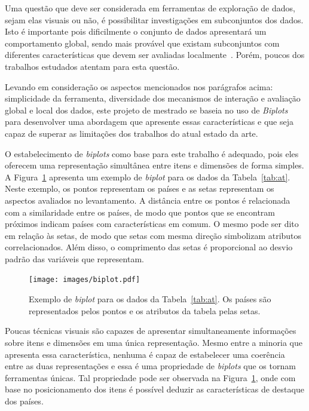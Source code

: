 Uma questão que deve ser considerada em ferramentas de
exploração de dados, sejam elas visuais ou não, é
possibilitar investigações em subconjuntos dos dados. Isto é
importante pois dificilmente o conjunto de dados apresentará
um comportamento global, sendo mais provável que existam
subconjuntos com diferentes características que devem ser
avaliadas localmente~\cite{May2011}. Porém, poucos dos
trabalhos estudados atentam para esta questão.

Levando em consideração os aspectos mencionados nos
parágrafos acima: simplicidade da ferramenta, diversidade
dos mecanismos de interação e avaliação global e local dos
dados, este projeto de mestrado se baseia no uso de
\emph{Biplots}~\cite{Gabriel1971} para desenvolver uma
abordagem que apresente essas características e que seja
capaz de superar as limitações dos trabalhos do atual estado
da arte.

O estabelecimento de \emph{biplots} como base para este trabalho é
adequado, pois eles oferecem uma representação simultânea
entre itens e dimensões de forma simples. A
Figura~\ref{fig:biplot} apresenta um exemplo de
\emph{biplot} para
os dados da Tabela~\ref{tab:at}.
Neste exemplo, os pontos representam os países e as setas
representam os aspectos avaliados no levantamento. A
distância entre os pontos é relacionada com a similaridade
entre os países, de modo que pontos que se encontram
próximos indicam países com características em comum. O
mesmo pode ser dito em relação às setas, de modo que setas
com mesma direção simbolizam atributos correlacionados. Além
disso, o comprimento das setas é proporcional ao desvio
padrão das variáveis que representam.

\begin{figure}[h!]
    \centering
    \texttt{[image: images/biplot.pdf]}
    \caption[Exemplo de \emph{biplot}]
    {Exemplo de \emph{biplot} para os dados da
    Tabela~\ref{tab:at}. Os países são representados pelos  
pontos e os atributos da tabela pelas setas.}
    \label{fig:biplot}
\end{figure}

Poucas técnicas visuais são capazes de apresentar
simultaneamente informações sobre itens e dimensões em uma
única representação. Mesmo entre a minoria que apresenta
essa característica, nenhuma é capaz de estabelecer uma
coerência entre as duas representações e essa é uma
propriedade de \emph{biplots} que os tornam ferramentas únicas. Tal
propriedade pode ser observada na Figura~\ref{fig:biplot},
onde com base no posicionamento dos itens é possível deduzir
as características de destaque dos países.

